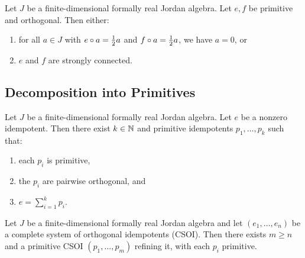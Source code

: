 \begin{theorem}
Let $J$ be a finite-dimensional formally real Jordan algebra. Let $e, f$ be primitive and orthogonal. Then either:
\begin{enumerate}
  \item for all $a \in J$ with $e \circ a = \frac{1}{2} a$ and $f \circ a = \frac{1}{2} a$, we have $a = 0$, or
  \item $e$ and $f$ are strongly connected.
\end{enumerate}
\end{theorem}

\subsection{Decomposition into Primitives}

\begin{theorem}
Let $J$ be a finite-dimensional formally real Jordan algebra. Let $e$ be a nonzero idempotent. Then there exist $k \in \mathbb{N}$ and primitive idempotents $p_1, \ldots, p_k$ such that:
\begin{enumerate}
  \item each $p_i$ is primitive,
  \item the $p_i$ are pairwise orthogonal, and
  \item $e = \sum_{i=1}^{k} p_i$.
\end{enumerate}
\end{theorem}

\begin{theorem}
Let $J$ be a finite-dimensional formally real Jordan algebra and let $(e_1, \ldots, e_n)$ be a complete system of orthogonal idempotents (CSOI). Then there exists $m \ge n$ and a primitive CSOI $(p_1, \ldots, p_m)$ refining it, with each $p_i$ primitive.
\end{theorem}
